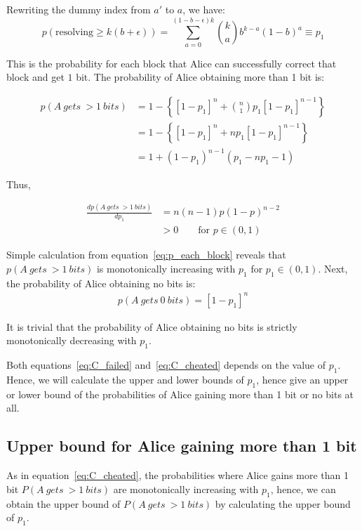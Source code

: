 \documentclass[%
 reprint,
superscriptaddress,
 amsmath,amssymb,
 aps,
]{revtex4-2}
\begin{document}
Rewriting the dummy index from $a'$ to $a$, we have:
\begin{equation}
    p(\text{resolving}\ge k(b+\epsilon)) = \sum_{a=0}^{(1-b-\epsilon)k}\binom{k}{a}b^{k-a}(1-b)^{a}\equiv p_1
    \label{eq:p_each_block}
\end{equation}


This is the probability for each block that Alice can successfully correct that block and get $1$ bit. The probability of Alice obtaining more than 1 bit is:

\begin{equation}
\begin{split}
    p(A\ gets\ > 1\ bits) &= 1-\left\{[1-p_1]^n+ \binom{n}{1} p_1[1-p_1]^{n-1}\right\}\\ 
    &= 1-\left\{[1-p_1]^n+np_1[1-p_1]^{n-1}\right\}\\
    &=1 + (1 - p_1)^{n-1} (p_1 - n p_1 - 1)
\end{split}
\label{eq:C_cheated}
\end{equation}

Thus, 

\begin{equation}
\begin{split}
    \frac{dp(A\ gets\ > 1\ bits)}{dp_1}&=n(n-1)p(1 - p)^{n-2}\\
    &>0\qquad \text{for $p\in(0, 1)$}
\end{split}
\end{equation}

Simple calculation from equation~\ref{eq:p_each_block} reveals that $p(A\ gets\ > 1\ bits)$ is monotonically increasing with $p_1$ for $p_1\in(0, 1)$. Next, the probability of Alice obtaining no bits is:
\begin{equation}
\begin{split}
    p(A\ gets\ 0\ bits) =[1-p_1]^n
    \label{eq:C_failed}
\end{split}
\end{equation}

It is trivial that the probability of Alice obtaining no bits is strictly monotonically decreasing with $p_1$.

Both equations~\ref{eq:C_failed} and~\ref{eq:C_cheated} depends on the value of $p_1$. Hence, we will calculate the upper and lower bounds of $p_1$, hence give an upper or lower bound of the probabilities of Alice gaining more than 1 bit or no bits at all.

\subsection{Upper bound for Alice gaining more than 1 bit}
As in equation~\ref{eq:C_cheated}, the probabilities where Alice gains more than 1 bit $P(A\ gets\ > 1\ bits)$ are monotonically increasing with $p_1$, hence, we can obtain the upper bound of $P(A\ gets\ > 1\ bits)$ by calculating the upper bound of $p_1$.
\end{document}

